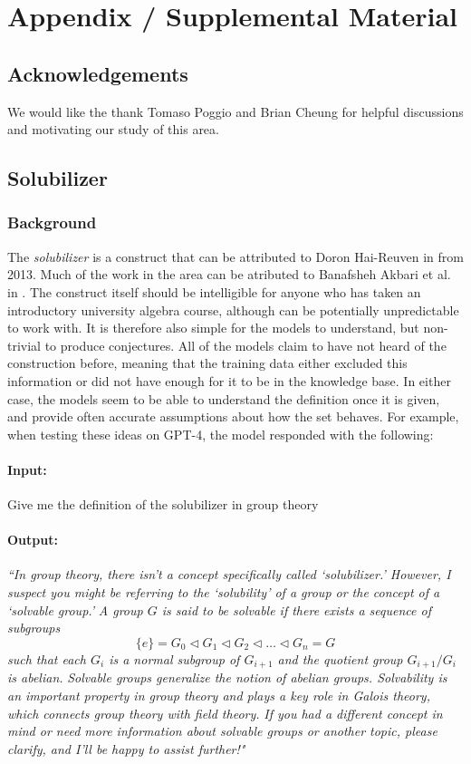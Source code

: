 \documentclass{article}
\begin{document}
\appendix\section{Appendix / Supplemental Material}
\subsection{Acknowledgements}
We would like the thank Tomaso Poggio and Brian Cheung for helpful discussions and motivating our study of this area. 
\subsection{Solubilizer}\label{solubilizer}
\subsubsection{Background}
The \textit{solubilizer} is a construct that can be attributed to Doron Hai-Reuven in \cite{haireuven2013nonsolvable} from 2013. Much of the work in the area can be atributed to Banafsheh Akbari et al. in \cite{akbari2018nonsolvable, akbari2020solubility, akbari2022solubilizer, SolvMinimalSimple}. The construct itself should be intelligible for anyone who has taken an introductory university algebra course, although can be potentially unpredictable to work with. It is therefore also simple for the models to understand, but non-trivial to produce conjectures. All of the models claim to have not heard of the construction before, meaning that the training data either excluded this information or did not have enough for it to be in the knowledge base. In either case, the models seem to be able to understand the definition once it is given, and provide often accurate assumptions about how the set behaves. For example, when testing these ideas on GPT-4, the model responded with the following:
\paragraph{Input:} Give me the definition of the solubilizer in group theory 
 \paragraph{Output:} \textit{``In group theory, there isn't a concept specifically called `solubilizer.' However, I suspect you might be referring to the `solubility' of a group or the concept of a `solvable group.'}
\textit{A group \(G\) is said to be solvable if there exists a sequence of subgroups}
\[ \{e\} = G_0 \triangleleft G_1 \triangleleft G_2 \triangleleft \dots \triangleleft G_n = G \]
\textit{such that each \(G_i\) is a normal subgroup of \(G_{i+1}\) and the quotient group \(G_{i+1}/G_i\) is abelian.}
\textit{Solvable groups generalize the notion of abelian groups. Solvability is an important property in group theory and plays a key role in Galois theory, which connects group theory with field theory.}
\textit{If you had a different concept in mind or need more information about solvable groups or another topic, please clarify, and I'll be happy to assist further!"}
\end{document}
